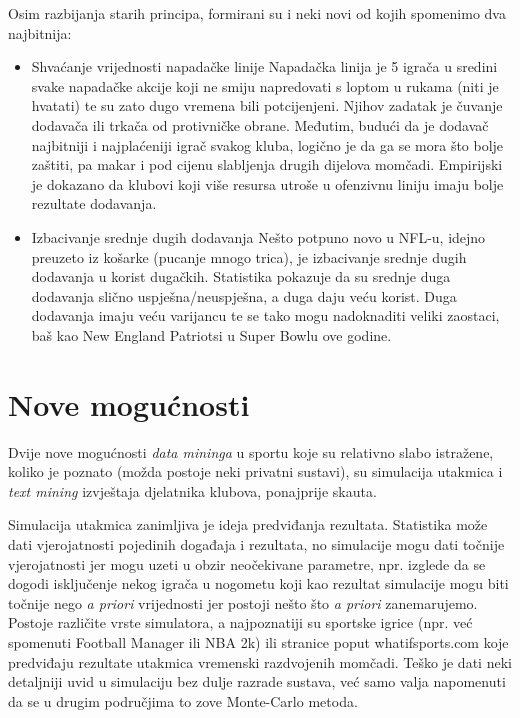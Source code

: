 \documentclass{ferseminar}
\begin{document}
Osim razbijanja starih principa, formirani su i neki novi od kojih spomenimo dva najbitnija:
\begin{itemize}
	\item Shvaćanje vrijednosti napadačke linije
	\newline
	Napadačka linija je 5 igrača u sredini svake napadačke akcije koji ne smiju napredovati s loptom u rukama (niti je hvatati) te su zato dugo vremena bili potcijenjeni. Njihov zadatak je čuvanje dodavača ili trkača od protivničke obrane. Međutim, budući da je dodavač najbitniji i najplaćeniji igrač svakog kluba, logično je da ga se mora što bolje zaštiti, pa makar i pod cijenu slabljenja drugih dijelova momčadi. Empirijski je dokazano da klubovi koji više resursa utroše u ofenzivnu liniju imaju bolje rezultate dodavanja. \cite{OL}
	\item Izbacivanje srednje dugih dodavanja \cite{Deep}
	\newline
	Nešto potpuno novo u NFL-u, idejno preuzeto iz košarke (pucanje mnogo trica), je izbacivanje srednje dugih dodavanja u korist dugačkih. Statistika pokazuje da su srednje duga dodavanja slično uspješna/neuspješna, a duga daju veću korist. Duga dodavanja imaju veću varijancu te se tako mogu nadoknaditi veliki zaostaci, baš kao New England Patriotsi u Super Bowlu ove godine. \cite{NEP}
\end{itemize}

\section{Nove mogućnosti}

Dvije nove mogućnosti \textit{data mininga} u sportu koje su relativno slabo istražene, koliko je poznato (možda postoje neki privatni sustavi), su simulacija utakmica i \textit{text mining} izvještaja djelatnika klubova, ponajprije skauta.

Simulacija utakmica zanimljiva je ideja predviđanja rezultata. Statistika može dati vjerojatnosti pojedinih događaja i rezultata, no simulacije mogu dati točnije vjerojatnosti jer mogu uzeti u obzir neočekivane parametre, npr. izglede da se dogodi isključenje nekog igrača u nogometu koji kao rezultat simulacije mogu biti točnije nego \textit{a priori} vrijednosti jer postoji nešto što \textit{a priori} zanemarujemo. Postoje različite vrste simulatora, a najpoznatiji su sportske igrice (npr. već spomenuti Football Manager ili NBA 2k) ili stranice poput whatifsports.com koje predviđaju rezultate utakmica vremenski razdvojenih momčadi. Teško je dati neki detaljniji uvid u simulaciju bez dulje razrade sustava, već samo valja napomenuti da se u drugim područjima to zove Monte-Carlo metoda. \cite{monte}  
\end{document}
